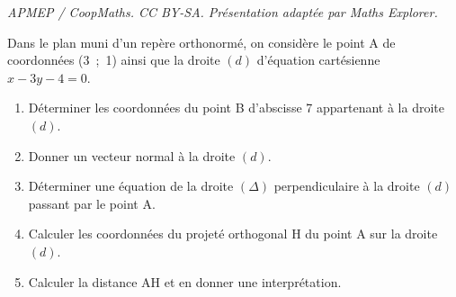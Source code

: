 \documentclass[10pt]{article}
\begin{document}
\noindent\textit{APMEP / CoopMaths. CC BY-SA. Présentation adaptée par Maths Explorer.}\par\medskip
\medskip

Dans le plan muni d'un repère orthonormé, on considère le point A de coordonnées (3~;~1) ainsi que la droite $(d)$ d'équation cartésienne $x - 3y - 4 = 0$.

\medskip

\begin{enumerate}
\item Déterminer les coordonnées du point B d'abscisse 7 appartenant à la droite $(d)$.
\item Donner un vecteur normal à la droite $(d)$.
\item Déterminer une équation de la droite $(\Delta)$ perpendiculaire à la droite $(d)$ passant par le point A.
\item Calculer les coordonnées du projeté orthogonal H du point A sur la droite $(d)$.
\item Calculer la distance AH et en donner une interprétation.
\end{enumerate}
\end{document}

